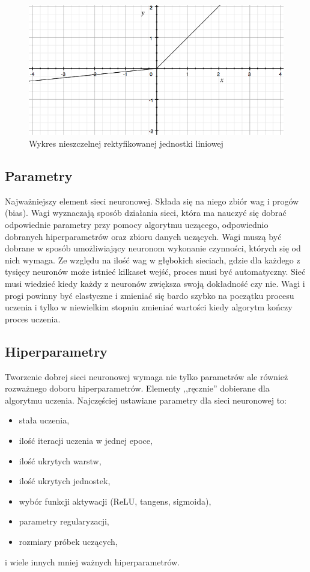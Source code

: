 \documentclass[12pt,a4paper,twoside,titlepage,openright]{book}
\begin{document}
\begin{figure}[ht]
	\centering
			\includegraphics[resolution=100, scale=0.8]{leakyReLU.png}
		\caption{Wykres nieszczelnej rektyfikowanej jednostki liniowej}
\end{figure}

\subsection{Parametry}
Najważniejszy element sieci neuronowej. Składa się na niego zbiór wag i progów (bias). Wagi wyznaczają sposób działania sieci, która ma nauczyć się dobrać odpowiednie parametry przy pomocy algorytmu uczącego, odpowiednio dobranych hiperparametrów oraz zbioru danych uczących. Wagi muszą być dobrane w sposób umożliwiający neuronom wykonanie czynności, których się od nich wymaga. Ze względu na ilość wag w głębokich sieciach, gdzie dla każdego z tysięcy neuronów może istnieć kilkaset wejść, proces musi być automatyczny. Sieć musi wiedzieć kiedy każdy z neuronów zwiększa swoją dokładność czy nie. Wagi i progi powinny być elastyczne i zmieniać się bardo szybko na początku procesu uczenia i tylko w niewielkim stopniu zmieniać wartości kiedy algorytm kończy proces uczenia.

\subsection{Hiperparametry}
Tworzenie dobrej sieci neuronowej wymaga nie tylko parametrów ale również rozważnego doboru hiperparametrów. Elementy ,,ręcznie'' dobierane dla algorytmu uczenia. Najczęściej ustawiane parametry dla sieci neuronowej to:
\begin{itemize}
\item stała uczenia,
\item ilość iteracji uczenia w jednej epoce,
\item ilość ukrytych warstw,
\item ilość ukrytych jednostek,
\item wybór funkcji aktywacji (ReLU, tangens, sigmoida),
\item parametry regularyzacji,
\item rozmiary próbek uczących,
\end{itemize}
i wiele innych mniej ważnych hiperparametrów.
\end{document}
